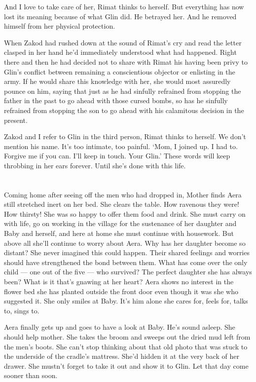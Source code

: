 \documentclass[twoside,11pt,openany]{book}
\begin{document}
And I love to take care of her, Rimat thinks to herself. But everything has now lost its meaning because of what Glin
did. He betrayed her. And he removed himself from her physical protection.

When Zakod had rushed down at the sound of Rimat's cry and read the letter clasped in her hand
he{'}d immediately understood what had happened. Right there and then he had decided not to share with
Rimat his having been privy to Glin's conflict between remaining a conscientious objector or enlisting in the
army. If he would share this knowledge with her, she would most assuredly pounce on him, saying that just as he had
sinfully refrained from stopping the father in the past to go ahead with those cursed bombs, so has he
sinfully refrained from stopping the son to go ahead with his calamitous decision  in the present.

Zakod and I refer to Glin in the third person, Rimat thinks to herself. We don't mention his name. It's
too intimate, too painful. `Mom, I joined up. I had to. Forgive me if you can. I'll keep in touch. Your
Glin.' These words will keep throbbing in her ears forever. Until she's done with this life.


\chapter{}

Coming home after seeing off the men who had dropped in, Mother finds Aera still stretched inert on her bed. She clears
the table. How ravenous they were! How thirsty! She was so happy to offer them food and drink. She must carry on with
life, go on working in the village for the sustenance of her daughter and Baby\textbf{ }and herself, and here at home
she must continue with housework.{ }But above all she'll continue to worry about Aera. Why has her
daughter become so distant? She never imagined this could happen.  Their shared feelings and worries should have
strengthened the bond between them. What has come over the only child --- one out of the five --- who survived? The perfect
daughter she has always been? What is it that's gnawing at her heart?  Aera shows no interest in the flower bed she has
planted outside the front door even though it was she who suggested it.  She only smiles at Baby. It's him alone she
cares for, feels for, talks to, sings to.

Aera finally gets up and goes to have a look at Baby. He's sound asleep. She should help mother. She takes the broom and
sweeps out the dried mud left from the men's boots. She can't stop thinking about that old photo that was stuck
to{ }the underside of the cradle's mattress. She'd hidden it at the very back of her drawer. She
mustn't forget to take it out and show it to Glin. Let that day come sooner than soon.
\end{document}
